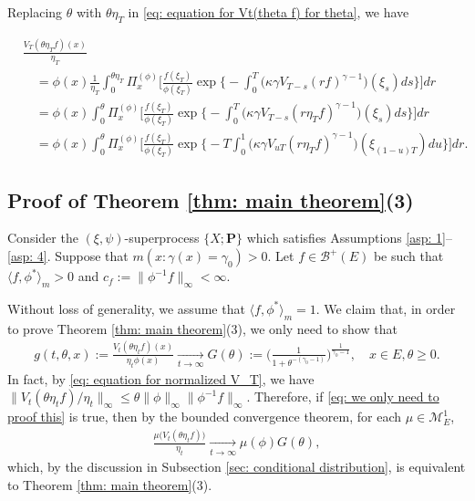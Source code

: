 \documentclass[12pt,a4paper]{amsart}
\theoremstyle{definition}
\numberwithin{equation}{section}
\begin{document}
Replacing $\theta$ with $\theta \eta_T$ in \eqref{eq: equation for Vt(theta f) for theta}, we have

\begin{align}\label{eq: equation for normalized V_T}
	&\frac{V_T(\theta \eta_T f)(x)}{\eta_T}
	\\&\quad= \phi(x) \frac{1}{\eta_T}\int_0^{\theta \eta_T} \Pi_x^{(\phi)} \Big[ \frac { f(\xi_T) } { \phi(\xi_T) } \exp\Big\{-\int_0^T \big(\kappa\gamma V_{T-s}(r f)^{\gamma-1}\big)(\xi_s) ds\Big\}\Big] dr
	\\&\quad = \phi(x) \int_0^{\theta} \Pi_x^{(\phi)} \Big[ \frac { f(\xi_T) } { \phi(\xi_T) }  \exp\Big\{-\int_0^T \big(\kappa\gamma V_{T-s}(r \eta_T f)^{\gamma-1}\big)(\xi_s) ds\Big\}\Big] dr
	\\&\quad = \phi(x)\int_0^{\theta} \Pi_x^{(\phi)} \Big[\frac{f(\xi_T)}{\phi(\xi_T)} \exp\Big\{-T\int_0^1 \big(\kappa\gamma V_{uT}(r \eta_T f)^{\gamma-1}\big)(\xi_{(1-u)T}) du\Big\}\Big] dr.
\end{align}




\subsection{Proof of Theorem \ref{thm: main theorem}(3)}
\label{sec: proof of result 3}
Consider the $(\xi, \psi)$-superprocess $\{X;\mathbf P\}$ which satisfies
Assumptions \ref{asp: 1}--\ref{asp: 4}.
Suppose that $m( x:\gamma(x)=\gamma_0 )>0$.
Let $f \in \mathscr B^+(E)$ be  such that $ \langle f, \phi^* \rangle_m > 0$  and $c_f :=\| \phi^{-1}f \|_\infty < \infty$.
	
Without loss of generality, we assume that $\langle f, \phi^* \rangle_m = 1$.
We claim that, in order to prove Theorem \ref{thm: main theorem}(3), we only need to show that
\begin{align}\label{eq: we only need to proof this}
	g(t,\theta,x)
	:=\frac{V_t (\theta \eta_t f) (x)}{\eta_t \phi(x)}
	\xrightarrow[t\to \infty]{} G(\theta)
	:= \Big( \frac{1}{1+\theta^{-(\gamma_0 - 1)}} \Big)^{ \frac{1}{\gamma_0 - 1} },
	\quad x\in E, \theta \geq 0.
\end{align}
In fact, by \eqref{eq: equation for normalized V_T}, we have $\|V_t(\theta \eta_t f)/ \eta_t \|_\infty \leq \theta \|\phi\|_\infty \|\phi^{-1}f\|_\infty.$
Therefore, if \eqref{eq: we only need to proof this} is true, then by the bounded convergence theorem, for each $\mu \in \mathcal M^1_E$,
\begin{align}
	\frac{\mu\big(V_t (\theta \eta_t f)\big)}{\eta_t }
	\xrightarrow[t\to \infty]{} \mu(\phi)G(\theta),
\end{align}
which, by the discussion in Subsection \ref{sec: conditional distribution}, is equivalent to Theorem \ref{thm: main theorem}(3).
		
\end{document}
